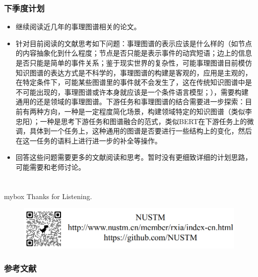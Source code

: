 \documentclass[10pt,aspectratio=43,mathserif]{beamer}
\begin{document}
        \begin{frame}
            \frametitle{\textbf{下季度计划}}
            \begin{itemize}
                \item 继续阅读近几年的事理图谱相关的论文。
                \item 针对目前阅读的文献思考如下问题：事理图谱的表示应该是什么样的（如节点的内容抽象化到什么程度；节点是否只能是表示事件的动宾短语；边上的信息是否只能是简单的事件关系；鉴于现实世界的复杂性，可能事理图谱目前模仿知识图谱的表达方式是不科学的，事理图谱的构建是客观的，应用是主观的，在特定条件下，可能某些图谱里的事件就不会发生了，这在传统知识图谱中是不可能出现的，事理图谱或许本身就应该是一个条件语言模型；），需要构建通用的还是领域的事理图谱。下游任务和事理图谱的结合需要进一步探索：目前有两种方向，一种是一定程度简化场景，构建领域特定的知识图谱（类似李忠阳）；一种是思考下游任务和图谱融合的范式，类似BERT在下游任务上的微调，具体到一个任务上，这种通用的图谱是否要进行一些结构上的变化，然后在这一任务的语料上进行进一步的补全等操作。
                \item 回答这些问题需要更多的文献阅读和思考。暂时没有更细致详细的计划思路，可能需要和老师讨论。
            \end{itemize}
        \end{frame}
            
\section*{}
            \begin{frame}

                \begin{center}
                    \begin{minipage}{1\textwidth}
                        \begin{beamercolorbox}[wd=0.70\textwidth, rounded=true, shadow=true]{mybox}
                        \LARGE \centering Thanks for Listening.
                        \end{beamercolorbox}
                    \end{minipage}
                \end{center}

                \begin{figure}[!t]
                    \centering
                    \includegraphics[width=.8\textwidth]{source/nustm_contact.png}
                    \label{figure4_ad}
                \end{figure}
            \end{frame}
            
\begin{frame}[allowframebreaks]
    \frametitle{参考文献}
        
        
   
\end{frame}
\end{document}
